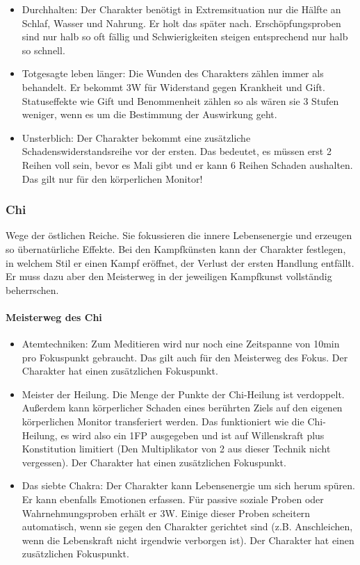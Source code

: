 \documentclass{article}
\begin{document}
\begin{itemize}
\item Durchhalten: Der Charakter benötigt in Extremsituation nur die Hälfte an Schlaf, Wasser und Nahrung. Er holt das später nach. Erschöpfungsproben sind nur halb so oft fällig und Schwierigkeiten steigen entsprechend nur halb so schnell.
\item Totgesagte leben länger: Die Wunden des Charakters zählen immer als behandelt. Er bekommt 3W für Widerstand gegen Krankheit und Gift. Statuseffekte wie Gift und Benommenheit zählen so als wären sie 3 Stufen weniger, wenn es um die Bestimmung der Auswirkung geht.
\item Unsterblich: Der Charakter bekommt eine zusätzliche Schadenswiderstandsreihe vor der ersten. Das bedeutet, es müssen erst 2 Reihen voll sein, bevor es Mali gibt und er kann 6 Reihen Schaden aushalten. Das gilt nur für den  körperlichen Monitor!
\end{itemize}

\subsubsection{Chi}

Wege der östlichen Reiche. Sie fokussieren die innere Lebensenergie und erzeugen so übernatürliche Effekte.
Bei den Kampfkünsten kann der Charakter festlegen, in welchem Stil er einen Kampf eröffnet, der Verlust der ersten
Handlung entfällt. Er muss dazu aber den Meisterweg in der jeweiligen Kampfkunst vollständig beherrschen.

\paragraph{Meisterweg des Chi}

\begin{itemize}
\item Atemtechniken: Zum Meditieren wird nur noch eine Zeitspanne von 10min pro Fokuspunkt gebraucht. Das gilt auch für den Meisterweg des Fokus. Der Charakter hat einen zusätzlichen Fokuspunkt.
\item Meister der Heilung. Die Menge der Punkte der Chi-Heilung ist verdoppelt. Außerdem kann körperlicher Schaden eines berührten Ziels auf den eigenen körperlichen Monitor transferiert werden. Das funktioniert wie die Chi-Heilung, es wird also ein 1FP ausgegeben und ist auf Willenskraft plus Konstitution limitiert (Den Multiplikator von 2 aus dieser Technik nicht vergessen). Der Charakter hat einen zusätzlichen Fokuspunkt.
\item Das siebte Chakra: Der Charakter kann Lebensenergie um sich herum spüren. Er kann ebenfalls Emotionen erfassen. Für passive soziale Proben oder Wahrnehmungsproben erhält er 3W. Einige dieser Proben scheitern automatisch, wenn sie gegen den Charakter gerichtet sind (z.B. Anschleichen, wenn die Lebenskraft nicht irgendwie verborgen ist). Der Charakter hat einen zusätzlichen Fokuspunkt.
\end{itemize}
\end{document}
